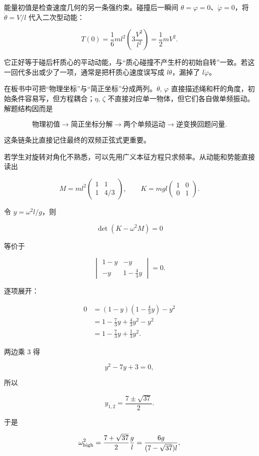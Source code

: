 \documentclass[12pt,a4paper,UTF8]{ctexart}
\begin{document}
能量初值是检查速度几何的另一条强约束。碰撞后一瞬间
\(\theta=\varphi=0\)、\(\dot\varphi=0\)，将 \(\dot\theta=V/l\)
代入二次型动能：

\[
T(0)
=\frac16ml^2\left(3\frac{V^2}{l^2}\right)
=\frac12mV^2.
\]

它正好等于碰后杆质心的平动动能，与``质心碰撞不产生杆的初始自转''一致。若这一回代多出或少了一项，通常是把杆质心速度误写成
\(l\dot\theta\)，漏掉了 \(l\dot\varphi\)。

在板书中可把``物理坐标''与``简正坐标''分成两列。\(\theta,\,\varphi\)
直接描述绳和杆的角度，初始条件容易写，但方程耦合；\(\eta,\,\zeta\)
不直接对应单一物体，但它们各自做单频振动。解题结构因而是

\[
\text{物理初值}
\longrightarrow
\text{简正坐标分解}
\longrightarrow
\text{两个单频运动}
\longrightarrow
\text{逆变换回题问量}.
\]

这条链条比直接记住最终的双频正弦式更重要。

若学生对旋转对角化不熟悉，可以先用广义本征方程只求频率。从动能和势能直接读出

\[
M=ml^2
\begin{pmatrix}
1&1\\
1&4/3
\end{pmatrix},
\qquad
K=mgl
\begin{pmatrix}
1&0\\
0&1
\end{pmatrix}.
\]

令 \(y=\omega^2l/g\)，则

\[
\det(K-\omega^2M)=0
\]

等价于

\[
\begin{vmatrix}
1-y&-y\\
-y&1-\frac43y
\end{vmatrix}=0.
\]

逐项展开：

\[
\begin{aligned}
0
&=(1-y)\left(1-\frac43y\right)-y^2\\
&=1-\frac73y+\frac43y^2-y^2\\
&=1-\frac73y+\frac13y^2.
\end{aligned}
\]

两边乘 \(3\) 得

\[
y^2-7y+3=0,
\]

所以

\[
y_{1,2}=\frac{7\pm\sqrt{37}}2.
\]

于是

\[
\omega_{\rm high}^2
=\frac{7+\sqrt{37}}2\frac gl
=\frac{6g}{(7-\sqrt{37})l},
\]
\end{document}
